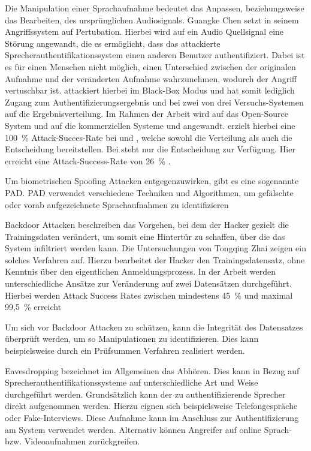 Die Manipulation einer Sprachaufnahme bedeutet das Anpassen, beziehungsweise das Bearbeiten, des ursprünglichen Audiosignals.
Guangke Chen setzt in seinem Angriffssystem  auf Pertubation.
Hierbei wird auf ein Audio Quellsignal eine Störung angewandt, die es ermöglicht, dass das attackierte Sprecherauthentifikationssystem einen anderen Benutzer authentifiziert.
Dabei ist es für einen Menschen nicht möglich, einen Unterschied zwischen der originalen Aufnahme und der veränderten Aufnahme wahrzunehmen, wodurch der Angriff vertuschbar ist.
 attackiert hierbei im Black-Box Modus und hat somit lediglich Zugang zum Authentifizierungsergebnis und bei zwei von drei Versuchs-Systemen auf die Ergebnisverteilung.
Im Rahmen der Arbeit wird  auf das Open-Source System  und auf die kommerziellen Systeme  und  angewandt.
 erzielt hierbei eine 100~\% Attack-Succes-Rate bei  und , welche sowohl die Verteilung als auch die Entscheidung bereitstellen.
Bei  steht nur die Entscheidung zur Verfügung.
Hier erreicht  eine Attack-Success-Rate von 26~\% \autocite[vgl. ][]{chen_who_2020}.

Um biometrischen Spoofing Attacken entgegenzuwirken, gibt es eine sogenannte \ac{PAD}.
\ac{PAD} verwendet verschiedene Techniken und Algorithmen, um gefälschte oder vorab aufgezeichnete Sprachaufnahmen zu identifizieren \autocite[vgl. ][]{paravision_introduction_2022}

Backdoor Attacken beschreiben das Vorgehen, bei dem der Hacker gezielt die Trainingsdaten verändert, um somit eine Hintertür zu schaffen, über die das System infiltriert werden kann.
Die Untersuchungen von Tongqing Zhai zeigen ein solches Verfahren auf.
Hierzu bearbeitet der Hacker den Trainingsdatensatz, ohne Kenntnis über den eigentlichen Anmeldungsprozess.
In der Arbeit werden unterschiedliche Ansätze zur Veränderung auf zwei Datensätzen durchgeführt.
Hierbei werden Attack Success Rates zwischen mindestens 45~\% und maximal 99,5~\% erreicht \autocite[vgl. ][]{zhai_backdoor_2021}

Um sich vor Backdoor Attacken zu schützen, kann die Integrität des Datensatzes überprüft werden, um so Manipulationen zu identifizieren.
Dies kann beispielsweise durch ein Prüfsummen Verfahren realisiert werden.

Eavesdropping bezeichnet im Allgemeinen das Abhören.
Dies kann in Bezug auf Sprecherauthentifikationssysteme auf unterschiedliche Art und Weise durchgeführt werden.
Grundsätzlich kann der zu authentifizierende Sprecher direkt aufgenommen werden.
Hierzu eignen sich beispielsweise Telefongespräche oder Fake-Interviews.
Diese Aufnahme kann im Anschluss zur Authentifizierung am System verwendet werden.
Alternativ können Angreifer auf online Sprach- bzw. Videoaufnahmen zurückgreifen.

